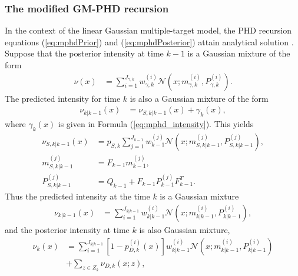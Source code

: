 \subsubsection{The modified GM-PHD recursion}
\label{sec:mGMPHDrec}
In the context of the linear Gaussian multiple-target model, the PHD recursion equations (\ref{eq:mphdPrior}) and (\ref{eq:mphdPosterior}) attain analytical solution \cite{VoMaPHD2006}.
Suppose that the posterior intensity at time $k-1$ is a Gaussian mixture of the form
\begin{equation}
  \label{eq:mphd_recursion_posterior}
  \begin{aligned}
    \nu(x) &= \sum_{i=1}^{J_{\gamma,k}} w_{\gamma,k}^{(i)}\mathcal{N}(x;m_{\gamma,k}^{(i)},P_{\gamma,k}^{(i)}).
  \end{aligned}
\end{equation}
The predicted intensity for time $k$ is also a Gaussian mixture of the form
\begin{equation}
  \label{eq:mphd_recursion_prior}
  \begin{aligned}
    \nu_{k|k-1}(x) &= \nu_{S,k|k-1}(x) + \gamma_k(x),
  \end{aligned}
\end{equation}
where $\gamma_k(x)$ is given in Formula (\ref{eq:mphd_intensity}). This yields
\begin{align}
  \nu_{S,k|k-1}(x) &= p_{S,k}\sum_{j=1}^{J_{k-1}}w_{k-1}^{(j)} \mathcal{N}(x;m_{S,k|k-1}^{(j)}, P_{S,k|k-1}^{(j)}) \label{eq:mphd_recursion_predict_intensity}, \\
  m_{S,k|k-1}^{(j)} &= F_{k-1}m_{k-1}^{(j)},  \label{eq:mphd_recursion_predict_m} \\
  P_{S,k|k-1}^{(j)} &= Q_{k-1} + F_{k-1}P_{k-1}^{(j)}F_{k-1}^T.  \label{eq:mphd_recursion_predict_P}
\end{align}
Thus the predicted intensity at the time $k$ is a Gaussian mixture
\begin{align}
  \nu_{k|k-1}(x) &= \sum_{i=1}^{J_{k|k-1}}w_{k|k-1}^{(i)} \mathcal{N}(x;m_{k|k-1}^{(i)}, P_{k|k-1}^{(i)}),  \label{eq:mphd_recursion_predict_intesity}
\end{align}
and the posterior intensity at time $k$ is also Gaussian mixture,
\begin{align}
  \nu_{k}(x) &= \sum_{i=1}^{J_{k|k-1}}[1-p_{D,k}^{(i)}(x)]w_{k|k-1}^{(i)} \mathcal{N}(x;m_{k|k-1}^{(i)}, P_{k|k-1}^{(
  i)})\nonumber \\
  &+ \sum_{z\in Z_k}\nu_{D,k}(x;z), \label{eq:mphd_recursion_update_intesity}
\end{align}
